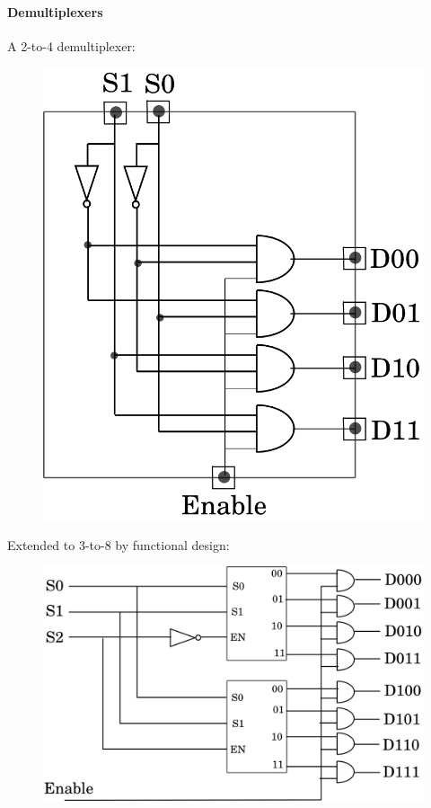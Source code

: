 \documentclass[twocolumn,english]{article}
\begin{document}
\paragraph{Demultiplexers}

A 2-to-4 demultiplexer:

\begin{figure}[H]
\noindent \centering{}\includegraphics[width=0.125\paperwidth]{img/dmx4}
\end{figure}


Extended to 3-to-8 by functional design:

\begin{figure}[H]
\noindent \centering{}\includegraphics[width=0.2\paperwidth]{img/dmx8}
\end{figure}
\end{document}

